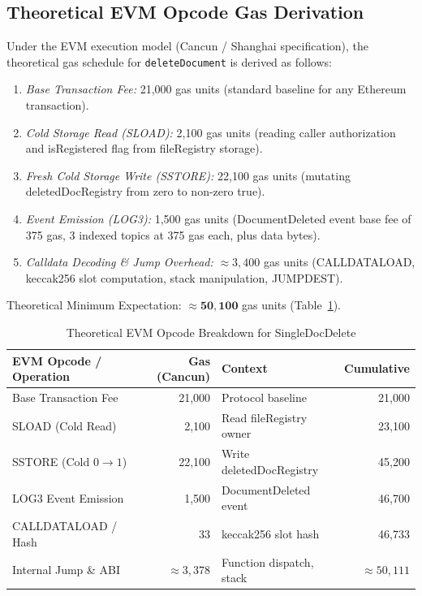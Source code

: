 \documentclass[journal,10pt,twocolumn]{IEEEtran}
\begin{document}
\subsection{Theoretical EVM Opcode Gas Derivation}
Under the EVM execution model (Cancun / Shanghai specification), the theoretical gas schedule for \texttt{deleteDocument} is derived as follows:
\begin{enumerate}
    \item \textit{Base Transaction Fee:} 21,000 gas units (standard baseline for any Ethereum transaction).
    \item \textit{Cold Storage Read (SLOAD):} 2,100 gas units (reading caller authorization and isRegistered flag from fileRegistry storage).
    \item \textit{Fresh Cold Storage Write (SSTORE):} 22,100 gas units (mutating deletedDocRegistry from zero to non-zero true).
    \item \textit{Event Emission (LOG3):} 1,500 gas units (DocumentDeleted event base fee of 375 gas, 3 indexed topics at 375 gas each, plus data bytes).
    \item \textit{Calldata Decoding \& Jump Overhead:} $\approx 3,400$ gas units (CALLDATALOAD, keccak256 slot computation, stack manipulation, JUMPDEST).
\end{enumerate}
Theoretical Minimum Expectation: $\approx \mathbf{50,100}$ gas units (Table~\ref{tab:gas_breakdown}).

\begin{table}[t]
\caption{Theoretical EVM Opcode Breakdown for SingleDocDelete}
\label{tab:gas_breakdown}
\centering
\begin{tabular}{lrlr}
\toprule
\textbf{EVM Opcode / Operation} & \textbf{Gas (Cancun)} & \textbf{Context} & \textbf{Cumulative} \\
\midrule
Base Transaction Fee & 21,000 & Protocol baseline & 21,000 \\
SLOAD (Cold Read) & 2,100 & Read fileRegistry owner & 23,100 \\
SSTORE (Cold $0 \to 1$) & 22,100 & Write deletedDocRegistry & 45,200 \\
LOG3 Event Emission & 1,500 & DocumentDeleted event & 46,700 \\
CALLDATALOAD / Hash & 33 & keccak256 slot hash & 46,733 \\
Internal Jump \& ABI & $\approx 3,378$ & Function dispatch, stack & $\approx 50,111$ \\
\bottomrule
\end{tabular}
\end{table}
\end{document}
